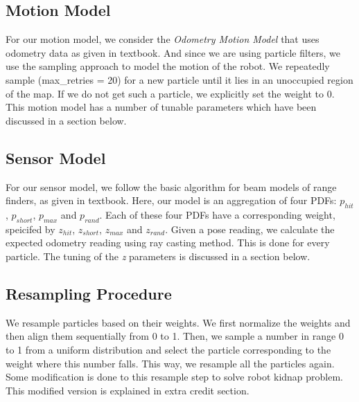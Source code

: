 \documentclass{article}
\begin{document}
\subsection{Motion Model}
For our motion model, we consider the \textit{Odometry Motion Model} that uses odometry data as given in textbook. And since we are using particle filters, we use the sampling approach to model the motion of the robot. We repeatedly sample (max\_retries = 20) for a new particle until it lies in an unoccupied region of the map. If we do not get such a particle, we explicitly set the weight to 0. This motion model has a number of tunable parameters which have been discussed in a section below.

\subsection{Sensor Model}
For our sensor model, we follow the basic algorithm for beam models of range finders, as given in textbook. Here, our model is an aggregation of four PDFs: $p_{hit}$, $p_{short}$, $p_{max}$ and $p_{rand}$. Each of these four PDFs have a corresponding weight, speicifed by $z_{hit}$, $z_{short}$, $z_{max}$ and $z_{rand}$. Given a pose reading, we calculate the expected odometry reading using ray casting method. This is done for every particle. The tuning of the \textit{z} parameters is discussed in a section below.



\subsection{Resampling Procedure}
We resample particles based on their weights. We first normalize the weights and then align them sequentially from 0 to 1. Then, we sample a number in range 0 to 1 from a uniform distribution and select the particle corresponding to the weight where this number falls. This way, we resample all the particles again. Some modification is done to this resample step to solve robot kidnap problem. This modified version is explained in extra credit section.
\end{document}
